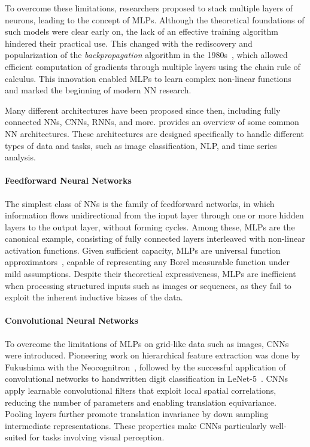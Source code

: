 To overcome these limitations, researchers proposed to stack multiple layers of neurons, leading to the concept of \glspl{MLP}.
%
Although the theoretical foundations of such models were clear early on, the lack of an effective training algorithm hindered their practical use.
%
This changed with the rediscovery and popularization of the \textit{backpropagation} algorithm in the 1980s~\cite{rumelhart1986learning}, which allowed efficient computation of gradients through multiple layers using the chain rule of calculus.
%
This innovation enabled \glspl{MLP} to learn complex non-linear functions and marked the beginning of modern \gls{NN} research.

Many different architectures have been proposed since then, including fully connected \glspl{NN}, \glspl{CNN}, \glspl{RNN}, and more.
%
 provides an overview of some common \gls{NN} architectures.
%
These architectures are designed specifically to handle different types of data and tasks, such as image classification, \gls{NLP}, and time series analysis.


\paragraph{Feedforward Neural Networks}
%
The simplest class of \glspl{NN} is the family of feedforward networks, in which information flows unidirectional from the input layer through one or more hidden layers to the output layer, without forming cycles.
%
Among these, \glspl{MLP} are the canonical example, consisting of fully connected layers interleaved with non-linear activation functions.
%
Given sufficient capacity, \glspl{MLP} are universal function approximators~\cite{hornik1989multilayer}, capable of representing any Borel measurable function under mild assumptions.
%
Despite their theoretical expressiveness, \glspl{MLP} are inefficient when processing structured inputs such as images or sequences, as they fail to exploit the inherent inductive biases of the data.

\paragraph{Convolutional Neural Networks}
%
To overcome the limitations of \glspl{MLP} on grid-like data such as images, \glspl{CNN} were introduced.
%
Pioneering work on hierarchical feature extraction was done by Fukushima with the Neocognitron~\cite{fukushima1980neocognitron}, followed by the successful application of convolutional networks to handwritten digit classification in LeNet-5~\cite{lecun1998gradient}.
%
\glspl{CNN} apply learnable convolutional filters that exploit local spatial correlations, reducing the number of parameters and enabling translation equivariance.
%
Pooling layers further promote translation invariance by down sampling intermediate representations.
%
These properties make \glspl{CNN} particularly well-suited for tasks involving visual perception.

